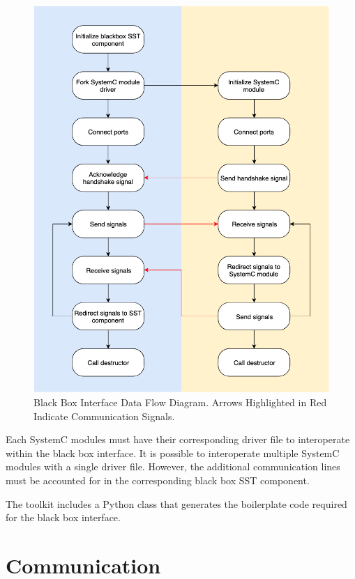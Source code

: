 \documentclass{article}
\begin{document}
    \begin{figure}[!h]
      \centering
      \includegraphics[width=5in]{diagrams/data_flow.png}
      \caption{Black Box Interface Data Flow Diagram. Arrows Highlighted in Red Indicate Communication Signals.}
      \label{fig:data_flow}
    \end{figure}

    Each SystemC modules must have their corresponding driver file to interoperate within the black
    box interface. It is possible to interoperate multiple SystemC modules with a single driver
    file. However, the additional communication lines must be accounted for in the corresponding
    black box SST component.

    The toolkit includes a Python class that generates the boilerplate code required for the black
    box interface.

  \section{Communication}
\end{document}
